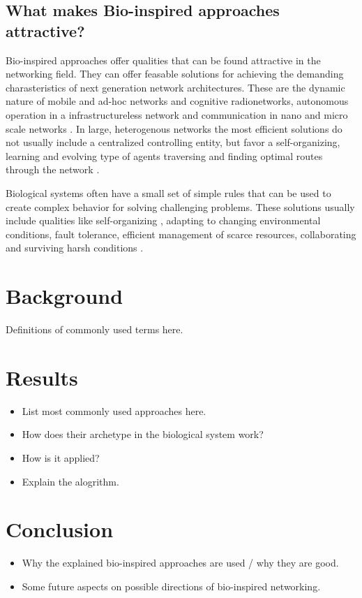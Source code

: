 \documentclass{IWORK2014}
\begin{document}
\subsection{What makes Bio-inspired approaches attractive?} 
Bio-inspired approaches offer qualities that can be found attractive in the networking field. They can offer feasable solutions for achieving the demanding charasteristics of next generation network architectures. These are the dynamic nature of mobile and ad-hoc networks and cognitive radionetworks, autonomous operation in a infrastructureless network and communication in nano and micro scale networks \cite{dressler2010bio}. In large, heterogenous networks the most efficient solutions do not usually include a centralized controlling entity, but favor a self-organizing, learning and evolving type of agents traversing and finding optimal routes through the network \cite{dressler2010bio}.

Biological systems often have a small set of simple rules that can be used to create complex behavior \cite{dressler2010bio} for solving challenging problems. These solutions usually include qualities like self-organizing \cite{kroeker2011biology}, adapting to changing environmental conditions, fault tolerance, efficient management of scarce resources, collaborating and surviving harsh conditions \cite{dressler2010bio}.

\section{Background}
Definitions of commonly used terms here.

\section{Results}

\begin{itemize}
	\item List most commonly used approaches here.
	\item How does their archetype in the biological system work?
	\item How is it applied?
	\item Explain the alogrithm.
\end{itemize}

\section{Conclusion}
\begin{itemize}
	\item Why the explained bio-inspired approaches are used / why they are good.
	\item Some future aspects on possible directions of bio-inspired networking.
\end{itemize}




\end{document}
